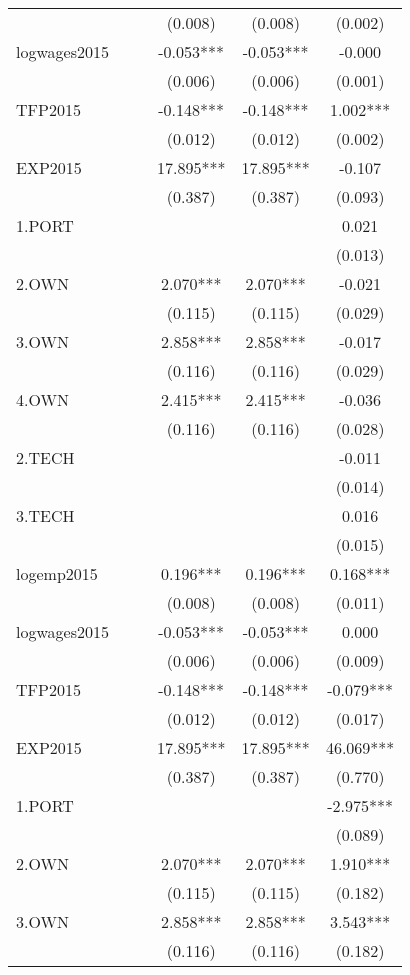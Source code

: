 \documentclass[]{article}
\begin{document}
\begin{landscape}
\begin{adjustbox}{width=1\textwidth}
\begin{tabular}{lccccc}
 &  &  & (0.008) & (0.008) & (0.002) \\
logwages2015 &  &  & -0.053*** & -0.053*** & -0.000 \\
 &  &  & (0.006) & (0.006) & (0.001) \\
TFP2015 &  &  & -0.148*** & -0.148*** & 1.002*** \\
 &  &  & (0.012) & (0.012) & (0.002) \\
EXP2015 &  &  & 17.895*** & 17.895*** & -0.107 \\
 &  &  & (0.387) & (0.387) & (0.093) \\
1.PORT &  &  &  &  & 0.021 \\
 &  &  &  &  & (0.013) \\
2.OWN &  &  & 2.070*** & 2.070*** & -0.021 \\
 &  &  & (0.115) & (0.115) & (0.029) \\
3.OWN &  &  & 2.858*** & 2.858*** & -0.017 \\
 &  &  & (0.116) & (0.116) & (0.029) \\
4.OWN &  &  & 2.415*** & 2.415*** & -0.036 \\
 &  &  & (0.116) & (0.116) & (0.028) \\
2.TECH &  &  &  &  & -0.011 \\
 &  &  &  &  & (0.014) \\
3.TECH &  &  &  &  & 0.016 \\
 &  &  &  &  & (0.015) \\
logemp2015 &  &  & 0.196*** & 0.196*** & 0.168*** \\
 &  &  & (0.008) & (0.008) & (0.011) \\
logwages2015 &  &  & -0.053*** & -0.053*** & 0.000 \\
 &  &  & (0.006) & (0.006) & (0.009) \\
TFP2015 &  &  & -0.148*** & -0.148*** & -0.079*** \\
 &  &  & (0.012) & (0.012) & (0.017) \\
EXP2015 &  &  & 17.895*** & 17.895*** & 46.069*** \\
 &  &  & (0.387) & (0.387) & (0.770) \\
1.PORT &  &  &  &  & -2.975*** \\
 &  &  &  &  & (0.089) \\
2.OWN &  &  & 2.070*** & 2.070*** & 1.910*** \\
 &  &  & (0.115) & (0.115) & (0.182) \\
3.OWN &  &  & 2.858*** & 2.858*** & 3.543*** \\
 &  &  & (0.116) & (0.116) & (0.182) \\

\end{tabular}
\end{adjustbox}
\end{landscape}
\end{document}
